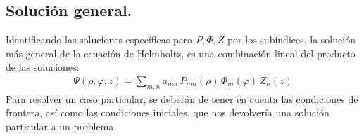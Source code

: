 \subsection{Solución general.}
Identificando las soluciones específicas para $P, \Phi, Z$ por los subíndices, la solución más general de la ecuación de Helmholtz, es una combinación lineal del producto de las soluciones:
\begin{align}
\Psi (\rho, \varphi, z) =  \sum_{m,n} a_{mn} \, P_{mn}(\rho) \, \Phi_{m}(\varphi) \, Z_{n}(z)
\label{eq:ecuacion_09_56}
\end{align}
Para resolver un caso particular, se deberán de tener en cuenta las condiciones de frontera, así como las condiciones iniciales, que nos devolvería una solución particular a un problema.
